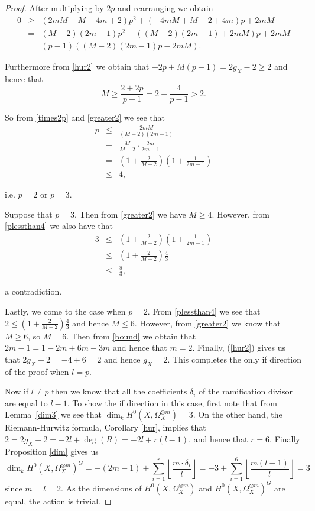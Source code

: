 \documentclass[draft, 11pt]{article} %
\theoremstyle{plain}
\theoremstyle{remark}
\begin{document}
\begin{proof}
	After multiplying by $2p$ and rearranging we obtain
		\begin{eqnarray}\label{times2p}
			0 & \geq & (2mM-M-4m+2)p^2+(-4mM+M-2+4m)p+2mM \nonumber \\
			& = & (M-2)(2m-1)p^2-((M-2)(2m-1)+2mM)p+2mM \nonumber \\
			& = & (p-1)((M-2)(2m-1)p-2mM).
	\end{eqnarray}

	Furthermore from \eqref{hur2} we obtain that $-2p+M(p-1)=2g_X-2 \geq 2$ and hence that 
		\begin{equation}\label{greater2}
			M\geq \frac{2+2p}{p-1}=2+\frac{4}{p-1}>2.
		\end{equation}

	So from \eqref{times2p} and \eqref{greater2} we see that
		\begin{eqnarray}\label{plessthan4}
			p & \leq & \frac{2mM}{(M-2)(2m-1)}\nonumber\\
			& = & \frac{M}{M-2}\cdot\frac{2m}{2m-1}\nonumber\\
			& = & \left( 1+\frac{2}{M-2} \right) \left(1+\frac{1}{2m-1} \right)\\
			& \leq & 4, \nonumber	
		\end{eqnarray}

	i.e. $p=2$ or $p=3$. 

	Suppose that $p=3$. Then from \eqref{greater2} we have $M\geq 4$. However, from  \eqref{plessthan4} we also have that 
		\begin{eqnarray*}
			3 & \leq &\left( 1+\frac{2}{M-2} \right) \left(1+\frac{1}{2m-1} \right)\\
			& \leq & \left( 1+\frac{2}{M-2} \right) \frac{4}{3}\\
			& \leq & \frac{8}{3},
		\end{eqnarray*}

	a contradiction.

	Lastly, we come to the case when $p=2$. From \eqref{plessthan4} we see that $2\leq \left(1+\frac{2}{M-2}\right)\frac{4}{3}$ 
	and hence $M\leq 6$. However, from \eqref{greater2} we know that $M\geq 6$, so $M=6$. Then from \eqref{bound}  we obtain that $2m-1=1-2m+6m-3m$
	and hence that $m=2$. Finally, (\ref{hur2}) gives us that $2g_X-2=-4+6=2$ and hence $g_X=2$. 
	This completes the only if direction of the proof when $l=p$.

    Now if $l\neq p$ then we know that all the coefficients $\delta_i$ of the ramification divisor are equal to $l-1$. 
    To show the if direction in this case, first note that from Lemma~\ref{dim3} we see that $\dim_kH^0(X,\Omega_X^{\otimes m})=3$. 
    On the other hand, the Riemann-Hurwitz formula, Corollary \ref{hur}, implies that $2 = 2g_X-2=-2l+\deg(R)=-2l+r(l-1)$, and hence that $r=6$. 
    Finally Proposition \ref{dim} gives us
      \begin{equation*}
	\dim_kH^0(X,\Omega_X^{\otimes m})^G = -(2m-1) + \sum_{i=1}^r \left\lfloor \frac{m\cdot \delta_i}{l} \right\rfloor
	= -3 +\sum_{i=1}^6 \left\lfloor \frac{m(l-1)}{l} \right\rfloor
	= 3
      \end{equation*}
    since $m=l=2$.
    As the dimensions of $H^0(X,\Omega_X^{\otimes m})$ and $H^0(X,\Omega_X^{\otimes m})^G$ are equal, the action is trivial.



\end{proof}
\end{document}
